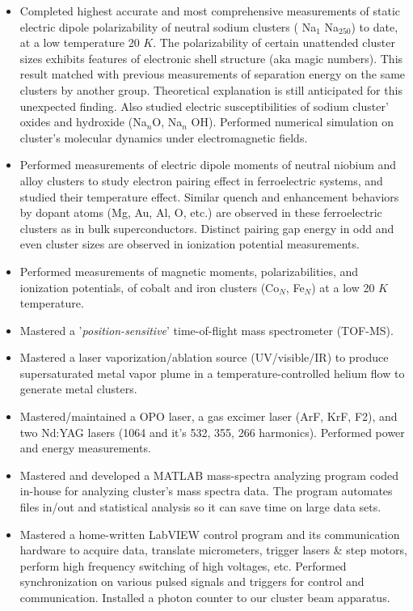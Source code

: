 \documentclass{sebase}
\begin{document}
\begin{itemize}
\item Completed highest accurate and most comprehensive measurements of
static electric dipole polarizability of neutral sodium clusters ( Na$_{1}$%
Na$_{250}$) to date, at a low temperature 20 $\unit{K}$. The
polarizability of certain unattended cluster sizes exhibits features of
electronic shell structure (aka magic numbers). This result matched with
previous measurements of separation energy on the same clusters by another
group. Theoretical explanation is still anticipated for this unexpected
finding. Also studied electric
susceptibilities of sodium cluster' oxides and hydroxide (Na$_{n}$O, Na$_{n}$%
OH). Performed numerical simulation on cluster's molecular dynamics under
electromagnetic fields.

\item Performed measurements of electric dipole moments of neutral niobium
and alloy clusters to study electron pairing effect in ferroelectric
systems, and studied their temperature effect. Similar quench and
enhancement behaviors by dopant atoms (Mg, Au, Al, O, etc.) are observed in
these ferroelectric clusters as in bulk superconductors. Distinct pairing
gap energy in odd and even cluster sizes are observed in ionization
potential measurements.\cite%
{Yin:2008:article-Electron-pairing-in-ferroelectri}

\item Performed measurements of magnetic moments, polarizabilities, and
ionization potentials, of cobalt and iron clusters (Co$_{N}$, Fe$_{N}$) at a
low 20 $\unit{K}$ temperature.

\item Mastered a '\textit{position-sensitive}' time-of-flight mass
spectrometer (TOF-MS).

\item Mastered a laser vaporization/ablation source (UV/visible/IR) to
produce supersaturated metal vapor plume in a temperature-controlled helium
flow to generate metal clusters.

\item Mastered/maintained a OPO laser, a gas excimer laser (ArF, KrF, F2),
and two Nd:YAG lasers (1064 and it's 532, 355, 266 harmonics). Performed
power and energy measurements.

\item Mastered and developed a MATLAB mass-spectra analyzing program coded
in-house for analyzing cluster's mass spectra data. The program automates
files in/out and statistical analysis so it can save time on large data sets.

\item Mastered a home-written LabVIEW control program and its communication
hardware to acquire data, translate micrometers, trigger lasers \& step
motors, perform high frequency switching of high voltages, etc. Performed
synchronization on various pulsed signals and triggers for control and
communication. Installed a photon counter to our cluster beam apparatus.
\end{itemize}
\end{document}
